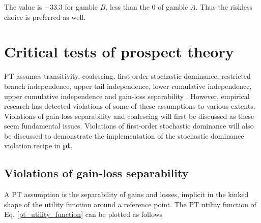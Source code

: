 \documentclass{article}\usepackage[]{graphicx}\usepackage[]{color}
\begin{document}
The value is $-33.3$ for gamble $B$, less than the $0$ of gamble $A$. Thus the riskless choice is preferred as well.

\section{Critical tests of prospect theory}

PT assumes transitivity, coalescing, first-order stochastic dominance, restricted branch independence,
upper tail independence, lower cumulative independence, upper cumulative independence and gain-loss separability \citep*{Birnbaum_2008}.
However, empirical research has detected violations of some of these assumptions to various extents. Violations of gain-loss separability and coalescing will first be discussed as these seem fundamental issues. Violations of first-order stochastic dominance will also be discussed to demonstrate the implementation of the \citet[][p. 74]{Birnbaum_1997} stochastic dominance violation recipe in {\bf pt}.

\subsection{Violations of gain-loss separability}

A PT assumption is the separability of gains and losses, implicit in the kinked shape of the utility function around a reference point.
The PT utility function of Eq. \eqref{pt_utility_function} can be plotted as follows
\end{document}

